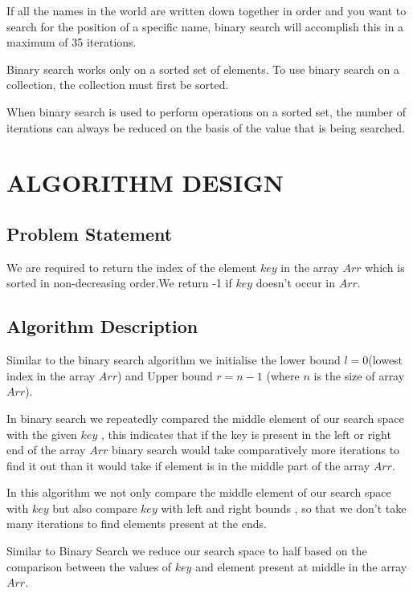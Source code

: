 \documentclass[conference]{IEEEtran}
\begin{document}
If all the names in the world are written down together in order and you want to search for the position of a specific name, binary search will accomplish this in a maximum of 35 iterations.

Binary search works only on a sorted set of elements. To use binary search on a collection, the collection must first be sorted.

When binary search is used to perform operations on a sorted set, the number of iterations can always be reduced on the basis of the value that is being searched.

\section{ALGORITHM DESIGN}
\subsection{Problem Statement}
 We are required to return the index of the element \(key\) in the array \(Arr\) which is sorted in non-decreasing order.We return -1 if \(key\) doesn't occur in \(Arr\).
\subsection{Algorithm Description}
Similar to the binary search algorithm we initialise the lower bound $l = 0 $(lowest index in the array \(Arr\)) and Upper bound $r = n-1$ (where \(n\) is the size of array \(Arr\)).

In binary search we repeatedly compared the middle element of our search space with the given \(key\)
, this indicates that if the key is present in the left or right end of the array \(Arr\) binary search would take comparatively more iterations to find it out than it would take if element is in the middle part of the array \(Arr\).

In this algorithm we not only compare the middle element of our search space with \(key\) but also compare \(key\) with left and right bounds , so that we don't take many iterations to find elements present at the ends.

Similar to Binary Search we reduce our search space to half based on the comparison between the values of \(key\) and element present at middle in the array \(Arr\).
\end{document}
